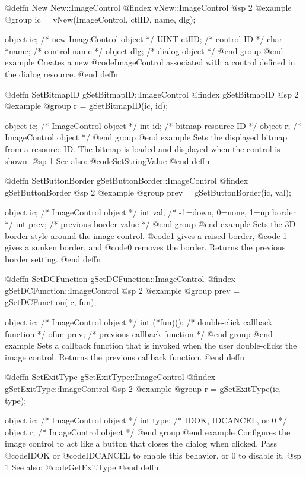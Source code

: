 @deffn {New} New::ImageControl
@findex vNew::ImageControl
@sp 2
@example
@group
ic = vNew(ImageControl, ctlID, name, dlg);

object  ic;       /*  new ImageControl object  */
UINT    ctlID;    /*  control ID               */
char    *name;    /*  control name             */
object  dlg;      /*  dialog object            */
@end group
@end example
Creates a new @code{ImageControl} associated with a control defined in
the dialog resource.
@end deffn



@deffn {SetBitmapID} gSetBitmapID::ImageControl
@findex gSetBitmapID
@sp 2
@example
@group
r = gSetBitmapID(ic, id);

object  ic;   /*  ImageControl object       */
int     id;   /*  bitmap resource ID         */
object  r;    /*  ImageControl object        */
@end group
@end example
Sets the displayed bitmap from a resource ID.  The bitmap is loaded and
displayed when the control is shown.
@sp 1
See also:  @code{SetStringValue}
@end deffn



@deffn {SetButtonBorder} gSetButtonBorder::ImageControl
@findex gSetButtonBorder
@sp 2
@example
@group
prev = gSetButtonBorder(ic, val);

object  ic;     /*  ImageControl object              */
int     val;    /*  -1=down, 0=none, 1=up border     */
int     prev;   /*  previous border value             */
@end group
@end example
Sets the 3D border style around the image control.  @code{1} gives a
raised border, @code{-1} gives a sunken border, and @code{0} removes
the border.  Returns the previous border setting.
@end deffn



@deffn {SetDCFunction} gSetDCFunction::ImageControl
@findex gSetDCFunction::ImageControl
@sp 2
@example
@group
prev = gSetDCFunction(ic, fun);

object  ic;     /*  ImageControl object               */
int     (*fun)();  /*  double-click callback function  */
ofun    prev;   /*  previous callback function         */
@end group
@end example
Sets a callback function that is invoked when the user double-clicks
the image control.  Returns the previous callback function.
@end deffn



@deffn {SetExitType} gSetExitType::ImageControl
@findex gSetExitType::ImageControl
@sp 2
@example
@group
r = gSetExitType(ic, type);

object  ic;     /*  ImageControl object        */
int     type;   /*  IDOK, IDCANCEL, or 0       */
object  r;      /*  ImageControl object        */
@end group
@end example
Configures the image control to act like a button that closes the dialog
when clicked.  Pass @code{IDOK} or @code{IDCANCEL} to enable this
behavior, or 0 to disable it.
@sp 1
See also:  @code{GetExitType}
@end deffn



